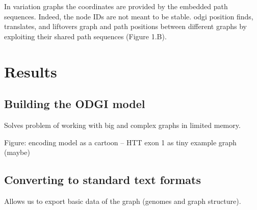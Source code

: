 \documentclass{bioinfo}
\begin{document}
In variation graphs the coordinates are provided by the embedded path sequences.
Indeed, the node IDs are not meant to be stable. odgi position finds, translates, and liftovers graph and path positions between different graphs by exploiting their shared path sequences (Figure 1.B).

\begin{comment}
key message of the paper is that we have collected a set of algorithms that enable easy use of pangenome graphs for investigating biology
-> build model solves problem of working with big graphs in memory
-> view (convert to GFA) & paths solve problem of exporting basic features of the graph (e.g. paths)
-> stats (understand basic size / structure) & bin & degree & depth solves problem of understanding the overall structure and size of the graph
-> sort (groom) & layout solves problem of finding latent structure in the pangenome
-> viz & draw provides a human-viewable readout of the graph
-> chop & unchop & squeeze & break & prune & explode lets us break apart or combine the graph nodes and topology
-> position & tips & untangle (jaccard based coordinate conversion) provides a way to map coordinates between any genomes in the graph (e.g. liftover!)
-> extract lets us pull out specific regions of the graph based on path ranges, nodes and positions
\end{comment}

\section{Results}

\subsection{Building the \textsc{ODGI} model}


Solves problem of working with big and complex graphs in limited memory.

Figure: encoding model as a cartoon --  HTT exon 1 as tiny example graph (maybe)

\subsection{Converting to standard text formats}


Allows us to export basic data of the graph (genomes and graph structure).
\end{document}
